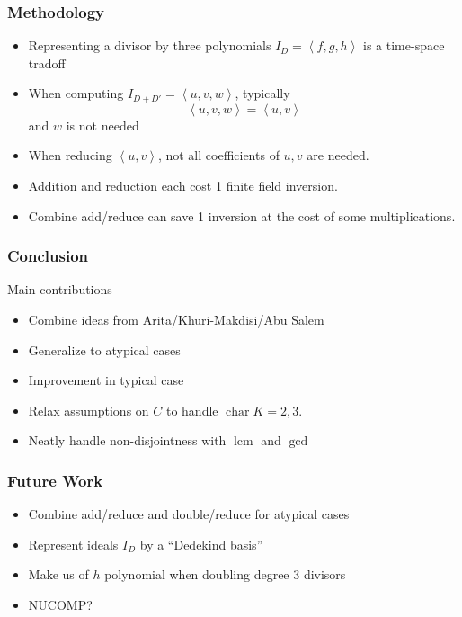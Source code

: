 \documentclass{beamer}
\newcommand{\pid}[1]{\left\langle #1 \right\rangle}
\DeclareMathOperator{\Char}{char}
\DeclareMathOperator{\lcm}{lcm}
\begin{document}

\begin{frame}
\frametitle{Methodology}
  \begin{itemize}
    \item Representing a divisor by three polynomials $I_D = \pid{f,g,h}$ is a time-space tradoff
    \item When computing $I_{D+D'} = \pid{u, v, w}$, typically \[ \pid{u,v,w} = \pid{u,v} \] and $w$ is not needed
    \item When reducing $\pid{u, v}$, not all coefficients of $u, v$ are needed. 
    \item Addition and reduction each cost 1 finite field inversion.
    \item Combine add/reduce can save 1 inversion at the cost of some multiplications.
  \end{itemize}
\end{frame}


\begin{frame}
\frametitle{Conclusion}
  Main contributions
  \begin{itemize}
    \item Combine ideas from Arita/Khuri-Makdisi/Abu Salem
    \item Generalize to atypical cases
    \item Improvement in typical case
    \item Relax assumptions on $C$ to handle $\Char K = 2, 3$.
    \item Neatly handle non-disjointness with $\lcm$ and $\gcd$
  \end{itemize}
\end{frame}


\begin{frame}
\frametitle{Future Work}
  \begin{itemize}
    \item Combine add/reduce and double/reduce for atypical cases
    \item Represent ideals $I_D$ by a ``Dedekind basis''
    \item Make us of $h$ polynomial when doubling degree 3 divisors
    \item NUCOMP?
  \end{itemize}
\end{frame}
\end{document}
